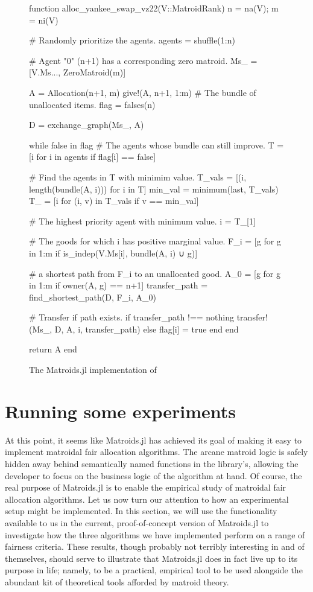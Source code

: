 \begin{figure}[ht!]
\begin{jllisting}
function alloc_yankee_swap_vz22(V::MatroidRank)
  n = na(V); m = ni(V)

  # Randomly prioritize the agents.
  agents = shuffle(1:n)

  # Agent "0" (n+1) has a corresponding zero matroid.
  Ms_ = [V.Ms..., ZeroMatroid(m)]

  A = Allocation(n+1, m)
  give!(A, n+1, 1:m) # The bundle of unallocated items.
  flag = falses(n)

  D = exchange_graph(Ms_, A)

  while false in flag
    # The agents whose bundle can still improve.
    T = [i for i in agents if flag[i] == false]
    
    # Find the agents in T with minimim value.
    T_vals = [(i, length(bundle(A, i))) for i in T]
    min_val = minimum(last, T_vals)
    T_ = [i for (i, v) in T_vals if v == min_val]

    # The highest priority agent with minimum value.
    i = T_[1] 

    # The goods for which i has positive marginal value.
    F_i = [g for g in 1:m if is_indep(V.Ms[i], bundle(A, i) ∪ g)]

    #  a shortest path from F_i to an unallocated good.
    A_0 = [g for g in 1:m if owner(A, g) == n+1]
    transfer_path = find_shortest_path(D, F_i, A_0)

    # Transfer if path exists.
    if transfer_path !== nothing
      transfer!(Ms_, D, A, i, transfer_path)
    else
      flag[i] = true
    end
  end
  
  return A
end
\end{jllisting}
\caption{The Matroids.jl implementation of }
\label{code:Yankee-Swap}
\end{figure}

\section{Running some experiments}
\label{chap:results}
At this point, it seems like Matroids.jl has achieved its goal of making it easy to implement matroidal fair allocation algorithms. The arcane matroid logic is safely hidden away behind semantically named functions in the library's, allowing the developer to focus on the business logic of the algorithm at hand. Of course, the real purpose of Matroids.jl is to enable the empirical study of matroidal fair allocation algorithms. Let us now turn our attention to how an experimental setup might be implemented. In this section, we will use the functionality available to us in the current, proof-of-concept version of Matroids.jl to investigate how the three algorithms we have implemented perform on a range of fairness criteria. These results, though probably not terribly interesting in and of themselves, should serve to illustrate that Matroids.jl does in fact live up to its purpose in life; namely, to be a practical, empirical tool to be used alongside the abundant kit of theoretical tools afforded by matroid theory.

